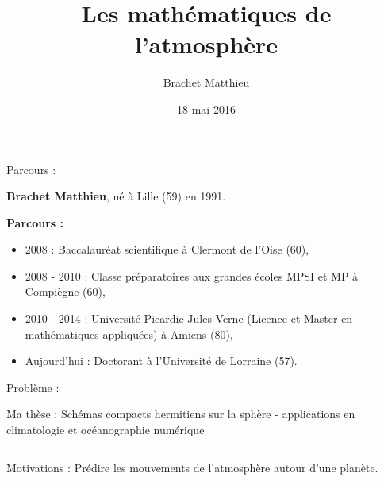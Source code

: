 \documentclass[11pt]{beamer}
\author{Brachet Matthieu}
\title{Les mathématiques de l'atmosphère}
\date[18.05.2016]{18 mai 2016}
\begin{document}
\begin{frame}
\titlepage
\end{frame}

\begin{frame}{Parcours :}

\textbf{Brachet Matthieu}, né à Lille (59) en 1991.

\vspace{1cm}
\textbf{Parcours : }
\begin{itemize}
\item 2008 : Baccalauréat scientifique à Clermont de l'Oise (60), \pause
\item 2008 - 2010 : Classe préparatoires aux grandes écoles MPSI et MP à Compiègne (60), \pause
\item 2010 - 2014 : Université Picardie Jules Verne (Licence et Master en mathématiques appliquées) à Amiens (80), \pause
\item Aujourd'hui : Doctorant à l'Université de Lorraine (57). 
\end{itemize}

\end{frame}


\begin{frame}{Problème :}

\begin{block}{Ma thèse :}
Schémas compacts hermitiens sur la sphère - applications en climatologie et océanographie numérique
\end{block}

\begin{columns}
\begin{block}{Motivations :}
Prédire les mouvements de l'atmosphère autour d'une planète.
\end{block}

\end{columns}
\end{frame}

\end{document}
